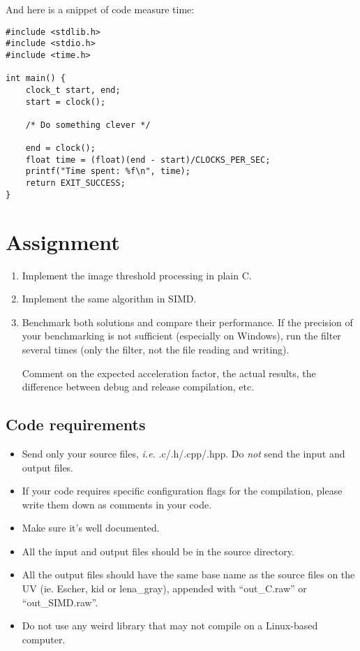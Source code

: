 \documentclass[10pt,a4paper]{article}
\theoremstyle{definition}%
\begin{document}
And here is a snippet of code measure time:
\begin{verbatim}
#include <stdlib.h>
#include <stdio.h>
#include <time.h>

int main() {
	clock_t start, end;
	start = clock();

	/* Do something clever */

	end = clock();
	float time = (float)(end - start)/CLOCKS_PER_SEC;
	printf("Time spent: %f\n", time);
	return EXIT_SUCCESS;
}
\end{verbatim}

\section*{Assignment}
\begin{enumerate}
	\item Implement the image threshold processing in plain C.
	\item Implement the same algorithm in SIMD.
	\item Benchmark both solutions and compare their performance.
	If the precision of your benchmarking is not sufficient (especially on Windows), run the filter several times (only the filter, not the file reading and writing).

	Comment on the expected acceleration factor, the actual results, the difference between debug and release compilation, etc.
\end{enumerate}

\subsection*{Code requirements}

\begin{itemize}
	\item Send only your source files, \textit{i.e.} .c/.h/.cpp/.hpp. Do \textit{not} send the input and output files.
	\item If your code requires specific configuration flags for the compilation, please write them down as comments in your code.
	\item Make sure it's well documented.
	\item All the input and output files should be in the source directory.
	\item All the output files should have the same base name as the source files on the UV (ie. Escher, kid or lena\_gray), appended with ``out\_C.raw'' or ``out\_SIMD.raw''.
	\item Do not use any weird library that may not compile on a Linux-based computer.
\end{itemize}
\end{document}
